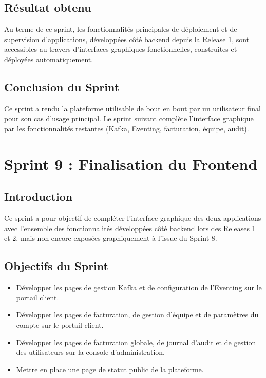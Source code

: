 \subsection{Résultat obtenu}

Au terme de ce sprint, les fonctionnalités principales de déploiement et de supervision d'applications, développées côté backend depuis la Release 1, sont accessibles au travers d'interfaces graphiques fonctionnelles, construites et déployées automatiquement.

\subsection{Conclusion du Sprint}

Ce sprint a rendu la plateforme utilisable de bout en bout par un utilisateur final pour son cas d'usage principal. Le sprint suivant complète l'interface graphique par les fonctionnalités restantes (Kafka, Eventing, facturation, équipe, audit).


\section{Sprint 9 : Finalisation du Frontend}

\subsection{Introduction}

Ce sprint a pour objectif de compléter l'interface graphique des deux applications avec l'ensemble des fonctionnalités développées côté backend lors des Releases 1 et 2, mais non encore exposées graphiquement à l'issue du Sprint 8.

\subsection{Objectifs du Sprint}

\begin{itemize}
    \item Développer les pages de gestion Kafka et de configuration de l'Eventing sur le portail client.
    \item Développer les pages de facturation, de gestion d'équipe et de paramètres du compte sur le portail client.
    \item Développer les pages de facturation globale, de journal d'audit et de gestion des utilisateurs sur la console d'administration.
    \item Mettre en place une page de statut public de la plateforme.
\end{itemize}


